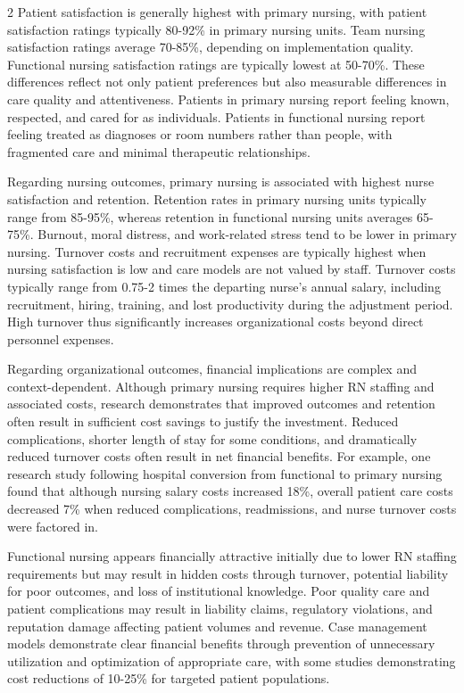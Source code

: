 \documentclass[12pt]{article}
\begin{document}
\begin{multicols}{2}
Patient satisfaction is generally highest with primary nursing, with patient satisfaction ratings typically 80-92\% in primary nursing units. Team nursing satisfaction ratings average 70-85\%, depending on implementation quality. Functional nursing satisfaction ratings are typically lowest at 50-70\%. These differences reflect not only patient preferences but also measurable differences in care quality and attentiveness. Patients in primary nursing report feeling known, respected, and cared for as individuals. Patients in functional nursing report feeling treated as diagnoses or room numbers rather than people, with fragmented care and minimal therapeutic relationships.

Regarding nursing outcomes, primary nursing is associated with highest nurse satisfaction and retention. Retention rates in primary nursing units typically range from 85-95\%, whereas retention in functional nursing units averages 65-75\%. Burnout, moral distress, and work-related stress tend to be lower in primary nursing. Turnover costs and recruitment expenses are typically highest when nursing satisfaction is low and care models are not valued by staff. Turnover costs typically range from 0.75-2 times the departing nurse's annual salary, including recruitment, hiring, training, and lost productivity during the adjustment period. High turnover thus significantly increases organizational costs beyond direct personnel expenses.

Regarding organizational outcomes, financial implications are complex and context-dependent. Although primary nursing requires higher RN staffing and associated costs, research demonstrates that improved outcomes and retention often result in sufficient cost savings to justify the investment. Reduced complications, shorter length of stay for some conditions, and dramatically reduced turnover costs often result in net financial benefits. For example, one research study following hospital conversion from functional to primary nursing found that although nursing salary costs increased 18\%, overall patient care costs decreased 7\% when reduced complications, readmissions, and nurse turnover costs were factored in.

Functional nursing appears financially attractive initially due to lower RN staffing requirements but may result in hidden costs through turnover, potential liability for poor outcomes, and loss of institutional knowledge. Poor quality care and patient complications may result in liability claims, regulatory violations, and reputation damage affecting patient volumes and revenue. Case management models demonstrate clear financial benefits through prevention of unnecessary utilization and optimization of appropriate care, with some studies demonstrating cost reductions of 10-25\% for targeted patient populations.


\end{multicols}
\end{document}
